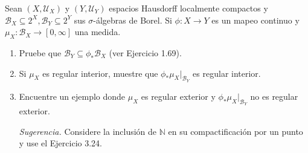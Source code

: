 \setcounter{neje}{24}
\begin{nejer}
Sean $(X, \mathcal{U}_X)$ y $(Y, \mathcal{U}_Y)$ espacios Hausdorff localmente compactos y $\mathcal{B}_X \subseteq 2^X, \mathcal{B}_Y \subseteq 2^Y$ sus $\sigma$-álgebras de Borel. Si $\phi \colon X \to Y$ es un mapeo continuo y $\mu_X \colon \mathcal{B}_X \to [0, \infty]$ una medida.
\begin{enumerate}[label = (\roman*), leftmargin=1.8em]
    \item Pruebe que $\mathcal{B}_Y \subseteq \phi_*\mathcal{B}_X$ (ver Ejercicio 1.69).
    \item Si $\mu_X$ es regular interior, muestre que $\phi_*\mu_X|_{\mathcal{B}_Y}$ es regular interior.
    \item Encuentre un ejemplo donde $\mu_X$ es regular exterior y $\phi_*\mu_X|_{\mathcal{B}_Y}$ no es regular exterior. \par
    \emph{Sugerencia.} Considere la inclusión de $\mathbb{N}$ en su compactificación por un punto y use el Ejercicio 3.24.
\end{enumerate}
\end{nejer}

